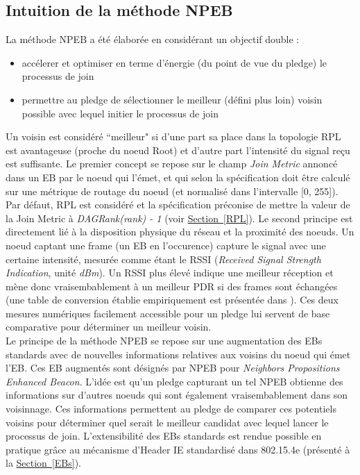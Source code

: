 \documentclass[]{report}
\newcommand{\wordlink}[2]{\hyperref[#2]{#1~\ref{#2}}}
\begin{document}
\subsection{Intuition de la méthode NPEB}

La méthode NPEB a été élaborée en considérant un objectif double :
\begin{itemize}[label=$\bullet$]
\item accélerer et optimiser en terme d'énergie (du point de vue du pledge) le processus de join
\item permettre au pledge de sélectionner le meilleur (défini plus loin) voisin possible avec lequel initier le processus de join
\end{itemize}

Un voisin est considéré ``meilleur" si d'une part sa place dans la topologie RPL est avantageuse (proche du noeud Root) et d'autre part l'intensité du signal reçu est suffisante.  Le premier concept se repose sur le champ \textit{Join Metric} annoncé dans un EB par le noeud qui l'émet, et qui selon la spécification \cite{rfc8180} doit être calculé sur une métrique de routage du noeud (et normalisé dans l'intervalle [0, 255]). Par défaut, RPL est considéré et la spécification préconise de mettre la valeur de la Join Metric à \textit{DAGRank(rank) - 1} (voir \wordlink{Section}{RPL}). Le second principe est directement lié à la disposition physique du réseau et la proximité des noeuds. Un noeud captant une frame (un EB en l'occurence) capture le signal avec une certaine intensité, mesurée comme étant le RSSI (\textit{Received Signal Strength Indication}, unité \textit{dBm}). Un RSSI plus élevé indique une meilleur réception et mène donc vraisembablement à un meilleur PDR si des frames sont échangées (une table de conversion établie empiriquement est présentée dans \cite{simulating-6TiSCH}). Ces deux mesures numériques facilement accessible pour un pledge lui servent de base comparative pour déterminer un meilleur voisin.\\

Le principe de la méthode NPEB se repose sur une augmentation des EBs standards avec de nouvelles informations relatives aux voisins du noeud qui émet l'EB. Ces EB augmentés sont désignés par NPEB pour \textit{Neighbors Propositions Enhanced Beacon}. L'idée est qu'un pledge capturant un tel NPEB obtienne des informations sur d'autres noeuds qui sont également vraisembablement dans son voisinnage. Ces informations permettent au pledge de comparer ces potentiels voisins pour déterminer quel serait le meilleur candidat avec lequel lancer le processus de join. L'extensibilité des EBs standards est rendue possible en pratique grâce au mécanisme d'Header IE standardisé dans 802.15.4e (présenté à la \wordlink{Section}{EBs}).\\
\end{document}

